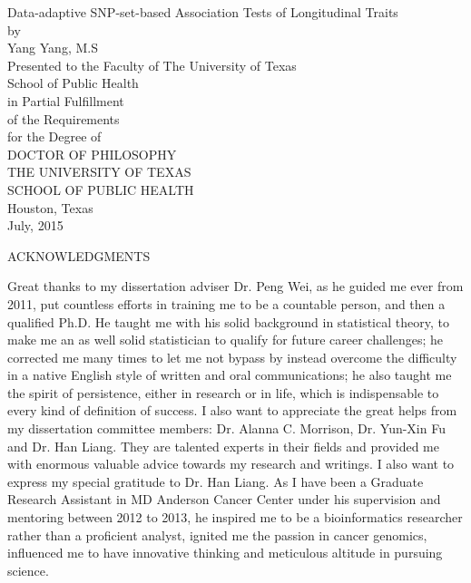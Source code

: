 \documentclass[12pt]{article}
\begin{document}
\newpage
\thispagestyle{empty}
\doublespacing
\begin{center}
{\normalsize Data-adaptive SNP-set-based Association Tests of Longitudinal Traits }\\[3.2cm]

by\\[0.5cm]

Yang Yang, M.S\\[3.2cm]

Presented to the Faculty of The University of Texas\\
School of Public Health\\
in Partial Fulfillment\\
of the Requirements\\
for the Degree of\\[1.5cm]
DOCTOR OF PHILOSOPHY\\[1.5cm]
\singlespacing
THE UNIVERSITY OF TEXAS\\
SCHOOL OF PUBLIC HEALTH\\
Houston, Texas\\
July, 2015
\end{center}


\newpage
\thispagestyle{empty}
\doublespacing
\begin{center}
ACKNOWLEDGMENTS
\end{center}
Great thanks to my dissertation adviser Dr. Peng Wei, as he guided me ever from 2011, put countless efforts in training me to be a countable person, and then a qualified Ph.D. He taught me with his solid background in statistical theory, to make me an as well solid statistician to qualify for future career challenges; he corrected me many times to let me not bypass by instead overcome the difficulty in a native English style of written and oral communications; he also taught me the spirit of persistence, either in research or in life, which is indispensable to every kind of definition of success. I also want to appreciate the great helps from my dissertation committee members: Dr. Alanna C. Morrison, Dr. Yun-Xin Fu and Dr. Han Liang. They are talented experts in their fields and provided me with enormous valuable advice towards my research and writings. I also want to express my special gratitude to Dr. Han Liang. As I have been a Graduate Research Assistant in MD Anderson Cancer Center under his supervision and mentoring between 2012 to 2013, he inspired me to be a bioinformatics researcher rather than a proficient analyst, ignited me the passion in cancer genomics, influenced me to have innovative thinking and meticulous altitude in pursuing science.
\end{document}

